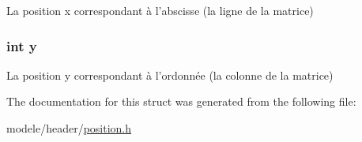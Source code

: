 La position x correspondant à l'abscisse (la ligne de la matrice) 

\hypertarget{struct_position_a0a2f84ed7838f07779ae24c5a9086d33}{
\subsubsection[{y}]{\setlength{\rightskip}{0pt plus 5cm}int y}}\label{struct_position_a0a2f84ed7838f07779ae24c5a9086d33}


La position y correspondant à l'ordonnée (la colonne de la matrice) 



The documentation for this struct was generated from the following file\-:\begin{DoxyCompactItemize}
\item 
modele/header/\hyperlink{position_8h}{position.\-h}\end{DoxyCompactItemize}
